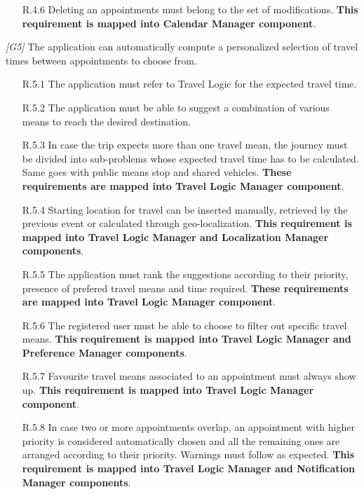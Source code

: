 \begin{description}
\begin{itemize}
		 	\item [R.4.6] Deleting an appointments must belong to the set of modifications.
		 	\textbf{This requirement is mapped into Calendar Manager component}.
		 \end{itemize}


	\item \textit{[G5]} The application can automatically compute a personalized selection of travel times between appointments to choose from.
		\begin{itemize}
			\item [R.5.1] The application must refer to Travel Logic for the expected travel time.

			\item [R.5.2] The application must be able to suggest a combination of various means to reach the desired destination.

			\item [R.5.3] In case the trip expects more than one travel mean, the journey must be divided into sub-problems whose expected travel time has to be calculated. Same goes with public means stop and shared vehicles.
			\textbf{These requirements are mapped into Travel Logic Manager component}.

			\item [R.5.4] Starting location for travel can be inserted manually, retrieved by the previous event or calculated through geo-localization.
			\textbf{This requirement is mapped into Travel Logic Manager and Localization Manager components}.

			\item [R.5.5] The application must rank the suggestions according to their priority, presence of prefered travel means and time required.
			\textbf{These requirements are mapped into Travel Logic Manager component}.

			\item [R.5.6] The registered user must be able to choose to filter out specific travel means.			
			\textbf{This requirement is mapped into Travel Logic Manager and Preference Manager components}.

			\item [R.5.7] Favourite travel means associated to an appointment must always show up.
			\textbf{This requirement is mapped into Travel Logic Manager component}.

			\item [R.5.8] In case two or more appointments overlap, an appointment with higher priority is considered automatically chosen and all the remaining ones are arranged according to their priority. Warnings must follow as expected.
			\textbf{This requirement is mapped into Travel Logic Manager and Notification Manager components}.


\end{itemize}
\end{description}
